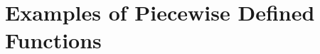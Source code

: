 \documentclass{xourse}
\begin{document}
\part{Examples of Piecewise Defined Functions}
\end{document}
